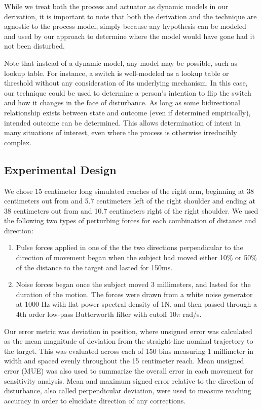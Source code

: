 While we treat both the process and actuator as dynamic models in our derivation, it is important to note that both the derivation and the technique are agnostic to the process model, simply because any hypothesis can be modeled and used by our approach to determine where the model would have gone had it not been disturbed. 

Note that instead of a dynamic model, any model may be possible, such as lookup table. For instance, a switch is well-modeled as a lookup table or threshold without any consideration of its underlying mechanism. In this case, our technique could be used to determine a person's intention to flip the switch and how it changes in the face of disturbance. As long as some bidirectional relationship exists between state and outcome (even if determined empirically), intended outcome can be determined. This allows determination of intent in many situations of interest, even where the process is otherwise irreducibly complex.

\subsection*{Experimental Design}
We chose 15 centimeter long simulated reaches of the right arm, beginning at 38 centimeters out from and 5.7 centimeters left of the right shoulder and ending at 38 centimeters out from and 10.7 centimeters right of the right shoulder.  We used the following two types of perturbing forces for each combination of distance and direction: 
\begin{enumerate}
\item Pulse forces applied in one of the the two directions perpendicular to the direction of movement began when the subject had moved either 10\% or 50\% of the distance to the target and lasted for 150ms.
\item Noise forces began once the subject moved 3 millimeters, and lasted for the duration of the motion. The forces were drawn from a white noise generator at 1000 Hz with flat power spectral density of 1N, and then passed through a 4th order low-pass Butterworth filter with cutoff $10 \pi$ rad/s.
\end{enumerate}
Our error metric was deviation in position, where unsigned error was calculated as the mean magnitude of deviation from the straight-line nominal trajectory to the target. This was evaluated across each of 150 bins measuring 1 millimeter in width and spaced evenly throughout the 15 centimeter reach. Mean unsigned error (MUE) was also used to summarize the overall error in each movement for sensitivity analysis. Mean and maximum signed error relative to the direction of disturbance, also called perpendicular deviation, were used to measure reaching accuracy in order to elucidate direction of any corrections.

